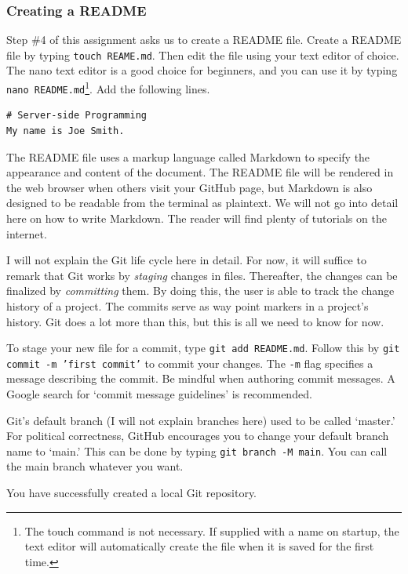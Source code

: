 \documentclass{article}
\begin{document}
\subsubsection{Creating a README}

Step \#4 of this assignment asks us to create a README file.  Create a README
file by typing \texttt{touch REAME.md}. Then edit the file using your
text editor of choice. The nano text editor is a good choice for beginners, and
you can use it by typing \texttt{nano README.md}\footnote{The touch
command is not necessary. If supplied with a name on startup, the text editor
will automatically create the file when it is saved for the first time.}. Add
the following lines.

\begin{verbatim}
# Server-side Programming
My name is Joe Smith.
\end{verbatim}

The README file uses a markup language called Markdown to specify the appearance
and content of the document. The README file will be rendered in the web browser
when others visit your GitHub page, but Markdown is also designed to be readable
from the terminal as plaintext. We will not go into detail here on how to write
Markdown. The reader will find plenty of tutorials on the internet.

I will not explain the Git life cycle here in detail. For now, it will suffice
to remark that Git works by \emph{staging} changes in files. Thereafter, the
changes can be finalized by \emph{committing} them. By doing this, the user is
able to track the change history of a project. The commits serve as way point
markers in a project's history. Git does a lot more than this, but this is all
we need to know for now.

To stage your new file for a commit, type \texttt{git add README.md}.
Follow this by \texttt{git commit -m 'first commit'} to commit your
changes. The \verb|-m| flag specifies a message describing the commit. Be
mindful when authoring commit messages. A Google search for `commit message
guidelines' is recommended.

Git's default branch (I will not explain branches here) used to be called
`master.' For political correctness, GitHub encourages you to change your
default branch name to `main.' This can be done by typing \texttt{git
branch -M main}. You can call the main branch whatever you want.

You have successfully created a local Git repository.
\end{document}
